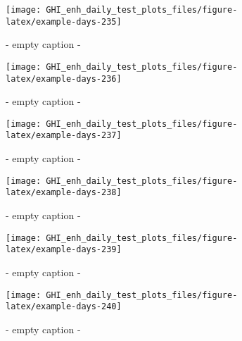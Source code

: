 \documentclass[
  10pt,
  a4paper,oneside]{article}
\begin{document}
\begin{figure}[H]

{\centering \texttt{[image: GHI\_enh\_daily\_test\_plots\_files/figure-latex/example-days-235]} 

}

\caption{ - empty caption - }\label{fig:example-days-235}
\end{figure}

\begin{figure}[H]

{\centering \texttt{[image: GHI\_enh\_daily\_test\_plots\_files/figure-latex/example-days-236]} 

}

\caption{ - empty caption - }\label{fig:example-days-236}
\end{figure}

\begin{figure}[H]

{\centering \texttt{[image: GHI\_enh\_daily\_test\_plots\_files/figure-latex/example-days-237]} 

}

\caption{ - empty caption - }\label{fig:example-days-237}
\end{figure}

\begin{figure}[H]

{\centering \texttt{[image: GHI\_enh\_daily\_test\_plots\_files/figure-latex/example-days-238]} 

}

\caption{ - empty caption - }\label{fig:example-days-238}
\end{figure}

\begin{figure}[H]

{\centering \texttt{[image: GHI\_enh\_daily\_test\_plots\_files/figure-latex/example-days-239]} 

}

\caption{ - empty caption - }\label{fig:example-days-239}
\end{figure}

\begin{figure}[H]

{\centering \texttt{[image: GHI\_enh\_daily\_test\_plots\_files/figure-latex/example-days-240]} 

}

\caption{ - empty caption - }\label{fig:example-days-240}
\end{figure}
\end{document}
